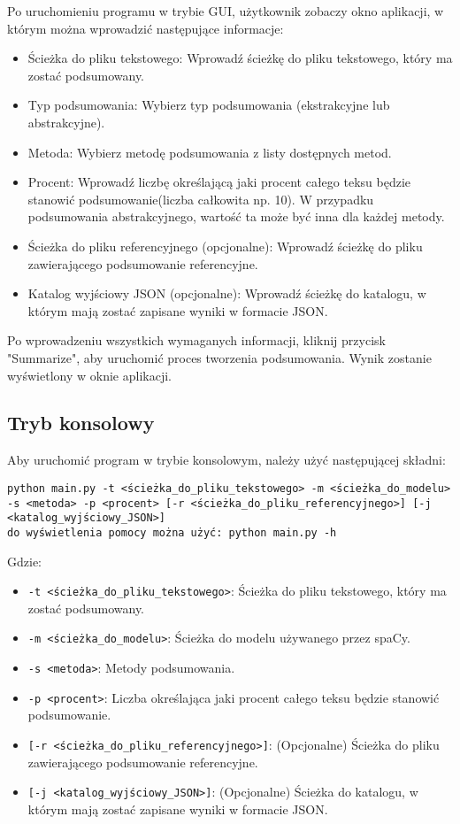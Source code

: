 \documentclass{article}
\begin{document}
Po uruchomieniu programu w trybie GUI, użytkownik zobaczy okno aplikacji, w którym można wprowadzić następujące informacje:
\begin{itemize}
    \item Ścieżka do pliku tekstowego: Wprowadź ścieżkę do pliku tekstowego, który ma zostać podsumowany.
    \item Typ podsumowania: Wybierz typ podsumowania (ekstrakcyjne lub abstrakcyjne).
    \item Metoda: Wybierz metodę podsumowania z listy dostępnych metod.
    \item Procent: Wprowadź liczbę określającą jaki procent całego teksu będzie stanowić podsumowanie(liczba całkowita np. 10). W przypadku podsumowania abstrakcyjnego, wartość ta może być inna dla każdej metody.
    \item Ścieżka do pliku referencyjnego (opcjonalne): Wprowadź ścieżkę do pliku zawierającego podsumowanie referencyjne.
    \item Katalog wyjściowy JSON (opcjonalne): Wprowadź ścieżkę do katalogu, w którym mają zostać zapisane wyniki w formacie JSON.
\end{itemize}

Po wprowadzeniu wszystkich wymaganych informacji, kliknij przycisk "Summarize", aby uruchomić proces tworzenia podsumowania. Wynik zostanie wyświetlony w oknie aplikacji.

\subsection{Tryb konsolowy}
Aby uruchomić program w trybie konsolowym, należy użyć następującej składni:
\begin{lstlisting}
python main.py -t <ścieżka_do_pliku_tekstowego> -m <ścieżka_do_modelu> -s <metoda> -p <procent> [-r <ścieżka_do_pliku_referencyjnego>] [-j <katalog_wyjściowy_JSON>]
do wyświetlenia pomocy można użyć: python main.py -h
\end{lstlisting}

Gdzie:
\begin{itemize}
    \item \texttt{-t <ścieżka\_do\_pliku\_tekstowego>}: Ścieżka do pliku tekstowego, który ma zostać podsumowany.
    \item \texttt{-m <ścieżka\_do\_modelu>}: Ścieżka do modelu używanego przez spaCy.
    \item \texttt{-s <metoda>}: Metody podsumowania.
    \item \texttt{-p <procent>}: Liczba określająca jaki procent całego teksu będzie stanowić podsumowanie.
    \item \texttt{[-r <ścieżka\_do\_pliku\_referencyjnego>]}: (Opcjonalne) Ścieżka do pliku zawierającego podsumowanie referencyjne.
    \item \texttt{[-j <katalog\_wyjściowy\_JSON>]}: (Opcjonalne) Ścieżka do katalogu, w którym mają zostać zapisane wyniki w formacie JSON.
\end{itemize}
\end{document}
